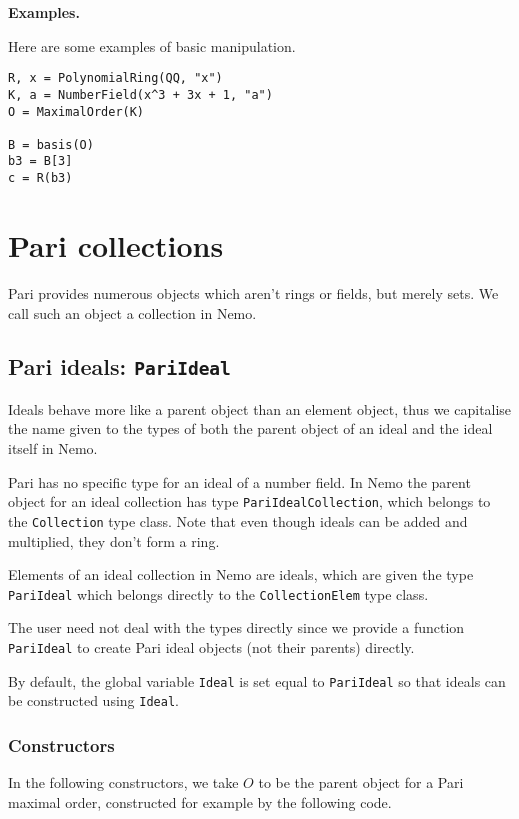 \documentclass[a4paper,10pt]{article}
\newcommand{\code}{\lstinline}
\begin{document}
{{\textbf{Examples.}

Here are some examples of basic manipulation.

\begin{lstlisting}
R, x = PolynomialRing(QQ, "x")
K, a = NumberField(x^3 + 3x + 1, "a")
O = MaximalOrder(K)

B = basis(O)
b3 = B[3]
c = R(b3)
\end{lstlisting}

\section{Pari collections}

Pari provides numerous objects which aren't rings or fields, but merely sets.
We call such an object a collection in Nemo.

\subsection{Pari ideals: \code|PariIdeal|}

Ideals behave more like a parent object than an element object, thus we capitalise
the name given to the types of both the parent object of an ideal and the ideal
itself in Nemo.

Pari has no specific type for an ideal of a number field. In Nemo the parent
object for an ideal collection has type \code{PariIdealCollection}, which belongs
to the \code{Collection} type class. Note that even though ideals can be added
and multiplied, they don't form a ring.

Elements of an ideal collection in Nemo are ideals, which are given the type
\code{PariIdeal} which belongs directly to the \code{CollectionElem} type class.

The user need not deal with the types directly since we provide a function
\code{PariIdeal} to create Pari ideal objects (not their parents) directly.

By default, the global variable \code{Ideal} is set equal to
\code{PariIdeal} so that ideals can be constructed using \code{Ideal}.

\subsubsection{Constructors}

In the following constructors, we take $O$ to be the parent object for a Pari
maximal order, constructed for example by the following code.

}}
\end{document}
